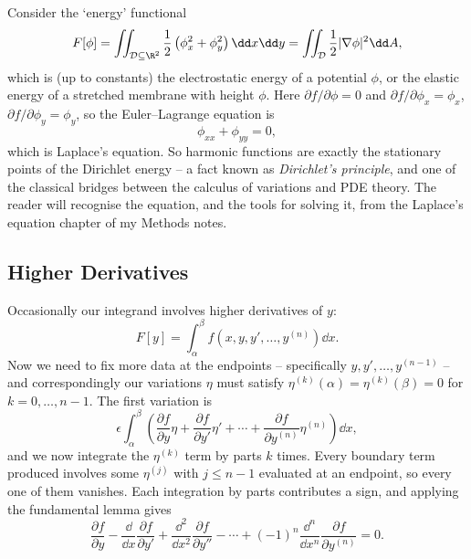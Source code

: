 \documentclass[a4paper]{scrartcl}
\begin{document}
\begin{example}
	Consider the `energy' functional
	$$
	F[\phi] = \iint_{\mathcal D \subseteq \R^2}\frac{1}{2}\left(\phi_x^2 + \phi_y^2\right)\dd x \dd y = \iint_{\mathcal D}\frac 12 |\nabla \phi|^2 \dd A,
	$$
	which is (up to constants) the electrostatic energy of a potential $\phi$, or the elastic energy of a stretched membrane with height $\phi$. Here $\partial f/\partial\phi = 0$ and $\partial f/\partial \phi_x = \phi_x$, $\partial f/\partial \phi_y = \phi_y$, so the Euler--Lagrange equation is
	$$
	\phi_{xx} + \phi_{yy} = 0,
	$$
	which is Laplace's equation. So harmonic functions are exactly the stationary points of the Dirichlet energy -- a fact known as \emph{Dirichlet's principle}, and one of the classical bridges between the calculus of variations and PDE theory. The reader will recognise the equation, and the tools for solving it, from the Laplace's equation chapter of my Methods notes.
\end{example}

\subsection{Higher Derivatives}

Occasionally our integrand involves higher derivatives of $y$:
$$
F[y] = \int_\alpha^\beta f\left(x, y, y', \dots, y^{(n)}\right)\dd x.
$$
Now we need to fix more data at the endpoints -- specifically $y, y', \dots, y^{(n-1)}$ -- and correspondingly our variations $\eta$ must satisfy $\eta^{(k)}(\alpha) = \eta^{(k)}(\beta) = 0$ for $k = 0, \dots, n-1$. The first variation is
$$
\epsilon\int_\alpha^\beta\left(\frac{\partial f}{\partial y}\eta + \frac{\partial f}{\partial y'}\eta' + \cdots + \frac{\partial f}{\partial y^{(n)}}\eta^{(n)}\right)\dd x,
$$
and we now integrate the $\eta^{(k)}$ term by parts $k$ times. Every boundary term produced involves some $\eta^{(j)}$ with $j \leq n-1$ evaluated at an endpoint, so every one of them vanishes. Each integration by parts contributes a sign, and applying the fundamental lemma gives
$$
\frac{\partial f}{\partial y} - \frac{\dd}{\dd x}\frac{\partial f}{\partial y'} + \frac{\dd^2}{\dd x^2}\frac{\partial f}{\partial y''} - \cdots + (-1)^n \frac{\dd^n}{\dd x^n}\frac{\partial f}{\partial y^{(n)}} = 0.
$$
\end{document}
